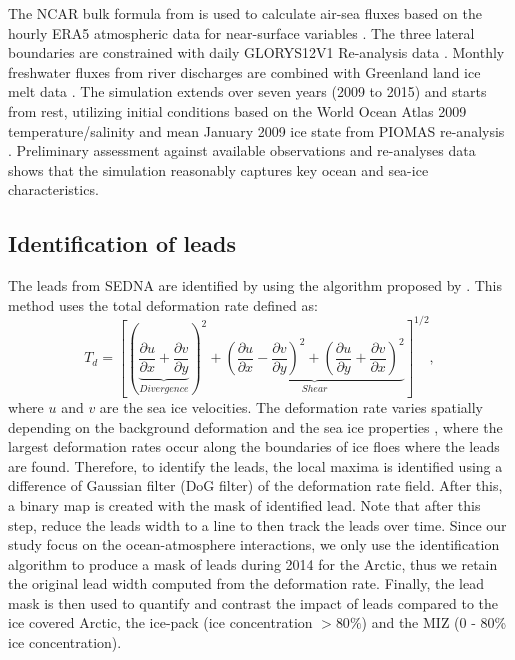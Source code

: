 \documentclass[lineno,sn-basic]{sn-jnl}%
\begin{document}
The NCAR bulk formula from \citet{Large_global_2009} is used to calculate air-sea fluxes based on the hourly ERA5 atmospheric data for near-surface variables \citep{Hersbach_ERA5_2020}. The three lateral boundaries are constrained with daily GLORYS12V1 Re-analysis data \citep{GLORYS12}. Monthly freshwater fluxes from river discharges are combined with Greenland land ice melt data \citep{HuEA_rivers_2019}. The simulation extends over seven years (2009 to 2015) and starts from rest, utilizing initial conditions based on the World Ocean Atlas 2009 temperature/salinity and mean January 2009 ice state from PIOMAS re-analysis \citep{Locarnini_data_2010, PIOMAS}. Preliminary assessment against available observations and re-analyses data shows that the simulation reasonably captures key ocean and sea-ice characteristics.


\subsection*{Identification of leads}

The leads from SEDNA are identified by using the algorithm proposed by \citet{Hutter_identification_2019}. This method uses the total deformation rate defined as: 
\begin{equation}
    T_d = \left[\left(\underbrace{\frac{\partial u}{\partial x} +\frac{\partial v}{\partial y}}_{Divergence}\right)^2 + \underbrace{\left(\frac{\partial u}{\partial x} - \frac{\partial v}{\partial y}\right)^2+ \left(\frac{\partial u}{\partial y} + \frac{\partial v}{\partial x}\right)^2}_{Shear}\right]^{1/2},
\end{equation}
where $u$ and $v$ are the sea ice velocities. The deformation rate varies spatially depending on the background deformation and the sea ice properties \citep{Reiser_LKF_2020}, where the largest deformation rates occur along the boundaries of ice floes where the leads are found. Therefore, to identify the leads, the local maxima is identified using a difference of Gaussian filter (DoG filter) of the deformation rate field. After this, a binary map is created with the mask of identified lead. Note that after this step, \citet{Hutter_identification_2019} reduce the leads width to a line to then track the leads over time. Since our study focus on the ocean-atmosphere interactions, we only use the identification algorithm to produce a mask of leads during 2014 for the Arctic, thus we retain the original lead width computed from the deformation rate. Finally, the lead mask is then used to quantify and contrast the impact of leads compared to the ice covered Arctic, the ice-pack (ice concentration $> 80\%$) and the MIZ (0 - 80\% ice concentration).
\end{document}
